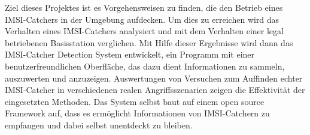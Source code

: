 Ziel dieses Projektes ist es Vorgehensweisen zu finden, die den Betrieb eines IMSI-Catchers in der Umgebung aufdecken.
Um dies zu erreichen wird das Verhalten eines IMSI-Catchers analysiert und mit dem Verhalten einer legal betriebenen Basisstation verglichen.
Mit Hilfe dieser Ergebnisse wird dann das IMSI-Catcher Detection System entwickelt, ein Programm mit einer benutzerfreundlichen Oberfl\"ache, das dazu dient Informationen zu sammeln, auszuwerten und anzuzeigen.
Auswertungen von Versuchen zum Auffinden echter IMSI-Catcher in verschiedenen realen Angriffsszenarien zeigen die Effektivität  der eingesetzten Methoden.
Das System selbst baut auf einem open source Framework auf, dass es erm\"oglicht Informationen von IMSI-Catchern zu empfangen und dabei selbst unentdeckt zu bleiben.

